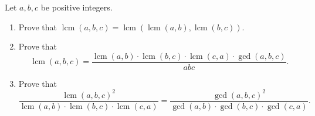 Let $a,b,c$ be positive integers.
\begin{enumerate}
\item[(a)] Prove that $\operatorname{lcm}(a,b,c)=\operatorname{lcm}\left(\operatorname{lcm}(a,b),\operatorname{lcm}(b,c)\right)$.
\item[(b)] Prove that
\[\operatorname{lcm}(a,b,c)=\dfrac{\operatorname{lcm}(a,b)\cdot\operatorname{lcm}(b,c)\cdot\operatorname{lcm}(c,a)\cdot\gcd(a,b,c)}{abc}.\]
\item[(c)] Prove that
\[\dfrac{\operatorname{lcm}(a,b,c)^2}{\operatorname{lcm}(a,b)\cdot\operatorname{lcm}(b,c)\cdot\operatorname{lcm}(c,a)}=\dfrac{\gcd(a,b,c)^2}{\gcd(a,b)\cdot\gcd(b,c)\cdot\gcd(c,a)}.\]
\end{enumerate}
